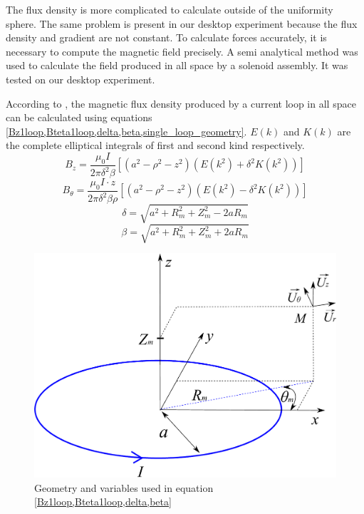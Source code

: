 \documentclass[letterpaper, 10 pt, conference]{ieeeconf}  %
\begin{document}
The flux density is more complicated to calculate outside of the uniformity sphere. The same problem is present in our desktop experiment because the flux density and gradient are not constant. To calculate forces accurately, it is necessary to compute the magnetic field precisely. A semi analytical method was used to calculate the field produced in all space by a solenoid assembly. It was tested on our desktop experiment.\par
According to \cite{simpson2001simple}, the magnetic flux density produced by a current loop in all space can be calculated using equations \cref{Bz1loop,Bteta1loop,delta,beta,single_loop_geometry}. $E(k)$ and $K(k)$ are the complete elliptical integrals of first and second kind respectively.
\begin{equation}
B_z=\frac{\mu _0I}{2\pi\delta ^{2}\beta  }\left [ \left ( a^2-\rho ^2-z^2 \right )(E(k^2)+\delta ^2K(k^2)) \right ] 
\label{Bz1loop}
\end{equation}
\begin{equation}
B_\theta=\frac{\mu _0 I \cdot z}{2\pi\delta ^{2}\beta\rho   }\left [ \left ( a^2-\rho ^2-z^2 \right )(E(k^2)-\delta ^2K(k^2)) \right ]
\label{Bteta1loop}
\end{equation}
\begin{equation}
\delta =\sqrt{a^2+R_m^2+Z_m^2-2aR_m}
\label{delta}
\end{equation}
\begin{equation}
\beta =\sqrt{a^2+R_m^2+Z_m^2+2aR_m}
\label{beta}
\end{equation}

\begin{figure}
  \includegraphics[width=\linewidth]{single_loop.pdf}
  \caption{Geometry and variables used in equation \cref{Bz1loop,Bteta1loop,delta,beta}}
  \label{single_loop_geometry}
\end{figure}
\end{document}
